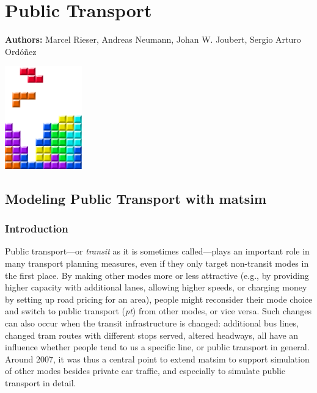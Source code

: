 \chapter{Public Transport}
\label{ch:pt}

\hfill \textbf{Authors:} Marcel Rieser, Andreas Neumann, Johan W. Joubert, Sergio Arturo Ordóñez

\begin{center} \includegraphics[width=0.25\textwidth, angle=0]{figures/MATSimBook.png} \end{center}


\section{Modeling Public Transport with \protect\gls{matsim}}
\subsection{Introduction}
Public transport---or \emph{transit} as it is sometimes called---plays
an important role in many transport planning measures, even if they only target
non-transit modes in the first place. By making other modes more or less
attractive (e.g., by providing higher capacity with additional lanes, allowing
higher speeds, or charging money by setting up road pricing for an area), people
might reconsider their mode choice and switch to public transport (\emph{pt})
from other modes, or vice versa. Such changes can also occur when the transit
infrastructure is changed: additional bus lines, changed tram routes with
different stops served, altered headways, all have an influence whether
people tend to us a specific line, or public transport in general. Around 2007,
it was thus a central point to extend \gls{matsim} to support simulation of other
modes besides private car traffic, and especially to simulate public transport
in detail.

